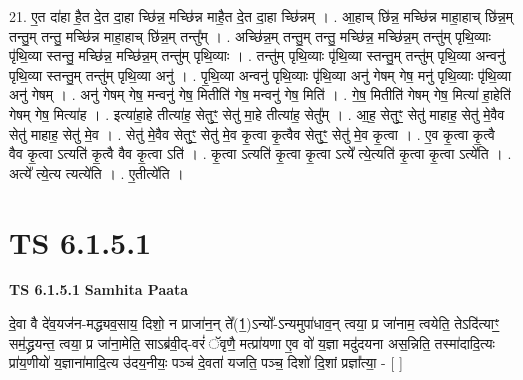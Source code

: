 \documentclass[17pt]{extarticle}
\begin{document}
21. ए॒त दा॑हा है॒त दे॒त दा॒हा च्छि॑न्न॒ मच्छि॑न्न माहै॒त दे॒त दा॒हा च्छि॑न्नम् । . आ॒हाच् छि॑न्न॒ मच्छि॑न्न माहा॒हाच् छि॑न्न॒म् तन्तु॒म् तन्तु॒ मच्छि॑न्न माहा॒हाच् छि॑न्न॒म् तन्तु᳚म् । . अच्छि॑न्न॒म् तन्तु॒म् तन्तु॒ मच्छि॑न्न॒ मच्छि॑न्न॒म् तन्तु॑म् पृथि॒व्याः पृ॑थि॒व्या स्तन्तु॒ मच्छि॑न्न॒ मच्छि॑न्न॒म् तन्तु॑म् पृथि॒व्याः । . तन्तु॑म् पृथि॒व्याः पृ॑थि॒व्या स्तन्तु॒म् तन्तु॑म् पृथि॒व्या अन्वनु॑ पृथि॒व्या स्तन्तु॒म् तन्तु॑म् पृथि॒व्या अनु॑ । . पृ॒थि॒व्या अन्वनु॑ पृथि॒व्याः पृ॑थि॒व्या अनु॑ गेषम् गेष॒ मनु॑ पृथि॒व्याः पृ॑थि॒व्या अनु॑ गेषम् । . अनु॑ गेषम् गेष॒ मन्वनु॑ गेष॒ मितीति॑ गेष॒ मन्वनु॑ गेष॒ मिति॑ । . गे॒ष॒ मितीति॑ गेषम् गेष॒ मित्या॑ हा॒हेति॑ गेषम् गेष॒ मित्या॑ह । . इत्या॑हा॒हे तीत्या॑ह॒ सेतुꣳ॒॒ सेतु॑ मा॒हे तीत्या॑ह॒ सेतु᳚म् । . आ॒ह॒ सेतुꣳ॒॒ सेतु॑ माहाह॒ सेतु॑ मे॒वैव सेतु॑ माहाह॒ सेतु॑ मे॒व । . सेतु॑ मे॒वैव सेतुꣳ॒॒ सेतु॑ मे॒व कृ॒त्वा कृ॒त्वैव सेतुꣳ॒॒ सेतु॑ मे॒व कृ॒त्वा । . ए॒व कृ॒त्वा कृ॒त्वै वैव कृ॒त्वा ऽत्यति॑ कृ॒त्वै वैव कृ॒त्वा ऽति॑ । . कृ॒त्वा ऽत्यति॑ कृ॒त्वा कृ॒त्वा ऽत्ये᳚ त्ये॒त्यति॑ कृ॒त्वा कृ॒त्वा ऽत्ये॑ति । . अत्ये᳚ त्ये॒त्य त्यत्ये॑ति । . ए॒तीत्ये॑ति । \newline
\pagebreak
{}

\section{ TS 6.1.5.1 }

\textbf{TS 6.1.5.1 } \newline
\textbf{Samhita Paata} \newline

दे॒वा वै दे॑व॒यज॑न-मद्ध्यव॒साय॒ दिशो॒ न प्राजा॑न॒न् ते᳚(1॒)ऽन्यो᳚-ऽन्यमुपा॑धाव॒न् त्वया॒ प्र जा॑नाम॒ त्वयेति॒ तेऽदि॑त्याꣳ॒॒ सम॒॑द्ध्रयन्त॒ त्वया॒ प्र जा॑ना॒मेति॒ साऽब्र॑वी॒द्-वरं॑ ॅवृणै॒ मत्प्रा॑यणा ए॒व वो॑ य॒ज्ञा मदु॑दयना अस॒न्निति॒ तस्मा॑दादि॒त्यः प्रा॑य॒णीयो॑ य॒ज्ञाना॑मादि॒त्य उ॑दय॒नीयः॒ पञ्च॑ दे॒वता॑ यजति॒ पञ्च॒ दिशो॑ दि॒शां प्रज्ञा᳚त्या॒ - [  ] \newline
\end{document}
